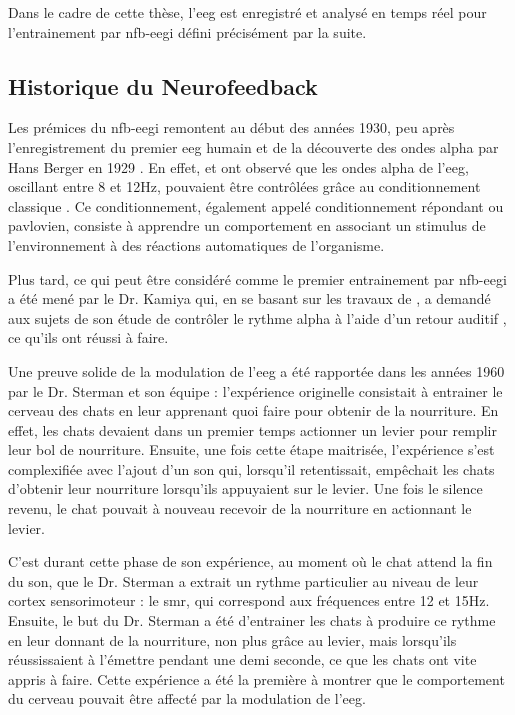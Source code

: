 Dans le cadre de cette thèse, l'\gls{eeg} est enregistré et analysé en temps réel pour l'entrainement par \gls{nfb}-\gls{eegi} défini précisément par la suite.  
 

\subsection{Historique du Neurofeedback}

Les prémices du \gls{nfb}-\gls{eegi} remontent au début des années 1930, peu après l'enregistrement du premier \gls{eeg} humain et de la découverte des ondes alpha par Hans Berger en 1929 \citep{Berger1929}.
En effet, \citet{Durup1935} et \citet{Loomis1936} ont observé que les ondes alpha de l'\gls{eeg}, oscillant entre 8 et 12Hz, pouvaient être contrôlées grâce au 
conditionnement classique \citep{Pavlov1929}. Ce conditionnement, également appelé conditionnement répondant ou pavlovien, consiste à apprendre un comportement en associant un stimulus
de l'environnement à des réactions automatiques de l'organisme.

Plus tard, ce qui peut être considéré comme le premier entrainement par \gls{nfb}-\gls{eegi} a été mené par le Dr. Kamiya qui, en se basant sur les travaux de \citet{Durup1935}, 
a demandé aux sujets de son étude de contrôler le rythme alpha à l'aide d'un retour auditif \citep{Kamiya1969}, ce qu'ils ont réussi à faire. 

Une preuve solide de la modulation de l'\gls{eeg} a été rapportée dans les années 1960 par le Dr. Sterman et son équipe \citep{Sterman1969} : l'expérience 
originelle consistait à entrainer le cerveau des chats en leur apprenant quoi faire pour obtenir de 
la nourriture. En effet, les chats devaient dans un premier temps actionner un levier pour remplir leur bol de nourriture. Ensuite, une fois cette étape maitrisée, 
l'expérience s'est complexifiée avec l'ajout d'un son qui, lorsqu'il retentissait, empêchait les chats d'obtenir leur nourriture lorsqu'ils appuyaient sur le levier.
Une fois le silence revenu, le chat pouvait à nouveau recevoir de la nourriture en actionnant le levier.  

C'est durant cette phase de son expérience, au moment où le chat attend la fin du son, que le Dr. Sterman a extrait un rythme particulier au niveau de leur cortex sensorimoteur : 
le \gls{smr}, qui correspond aux fréquences entre 12 et 15Hz. Ensuite, le but du Dr. Sterman a été d'entrainer les chats à produire ce rythme en leur donnant de la nourriture, non plus grâce 
au levier, mais lorsqu'ils réussissaient à l'émettre pendant une demi seconde, ce que les chats ont vite appris à faire. Cette expérience a été la première à montrer que le comportement
du cerveau pouvait être affecté par la modulation de l'\gls{eeg}. 

